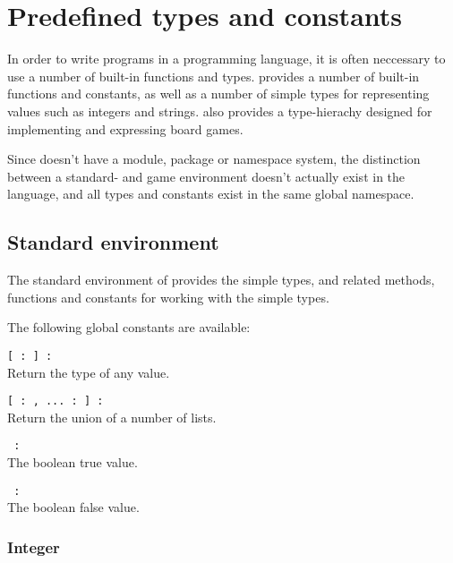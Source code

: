\section{Predefined types and constants}
\label{sec:predefined}

In order to write programs in a programming language, it is often neccessary to use a number of built-in
functions and types. \productname{} provides a number of built-in functions and constants, as well as 
a number of simple types for representing values such as integers and strings. \productname{} also provides
a type-hierachy designed for implementing and expressing board games.

Since \productname{} doesn't have a module, package or namespace system, the distinction between a standard-
and game environment doesn't actually exist in the language, and all types and constants exist in the same
global namespace.

\subsection{Standard environment}

The standard environment of \productname{} provides the simple types, and related methods, functions and
constants for working with the simple types.

The following global constants are available:

\begin{dlist}
  \item \texttt{[ : \opstar] : }\\
    Return the type of any value.
  \item \texttt{[ : , ...  : ] : }\\
    Return the union of a number of lists.
  \item \texttt{ : }\\
    The boolean true value.
  \item \texttt{ : }\\
    The boolean false value.
\end{dlist}

\subsubsection{Integer}

